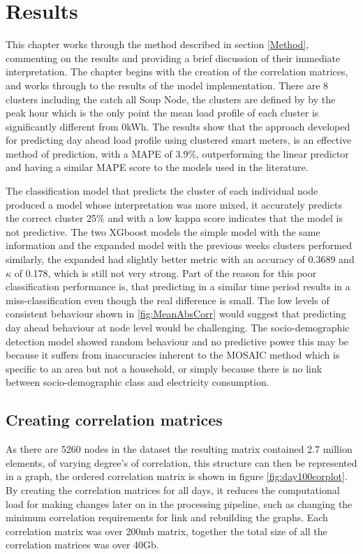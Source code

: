 \chapter{Results}
\label{Results}

This chapter works through the method described in section \ref{Method}, commenting on the results and providing a brief discussion of their immediate interpretation. The chapter begins with the creation of the correlation matrices, and works through to the results of the model implementation. There are 8 clusters including the catch all Soup Node, the clusters are defined by by the peak hour which is the only point the mean load profile of each cluster is significantly different from 0kWh.  The results show that the approach developed for predicting day ahead load profile using clustered smart meters, is an effective method of prediction, with a MAPE of 3.9\%, outperforming the linear predictor and having a similar MAPE score to the models used in the literature.

The classification model that predicts the cluster of each individual node produced a model whose interpretation was more mixed, it accurately predicts the correct cluster 25\% and with a low kappa score indicates that the model is not predictive. The two XGboost models the simple model with the same information and the expanded model with the previous weeks clusters performed similarly, the expanded had slightly better metric with an accuracy of  0.3689 and $\kappa$ of 0.178, which is still not very strong. Part of the reason for this poor classification performance is, that predicting in a similar time period results in a miss-classification even though the real difference is small. The low levels of consistent behaviour shown in \ref{fig:MeanAbsCorr} would suggest that predicting day ahead behaviour at node level would be challenging.  The socio-demographic detection model showed random behaviour and no predictive power this may be because it suffers from inaccuracies inherent to the MOSAIC method which is specific to an area but not a household, or simply because there is no link between socio-demographic class and electricity consumption.


\section{Creating correlation matrices} \label{sec:CormatEdge}
As there are 5260 nodes in the dataset the resulting matrix contained 2.7 million elements, of varying degree's of correlation, this structure can then be represented in a graph, the ordered correlation matrix is shown in figure \ref{fig:day100corplot}. By creating the correlation matrices for all days, it reduces the computational load for making changes later on in the processing pipeline, such as changing the minimum correlation requirements for link and rebuilding the graphs. Each correlation matrix was over 200mb matrix, together the total size of all the correlation matrices was over 40Gb.

